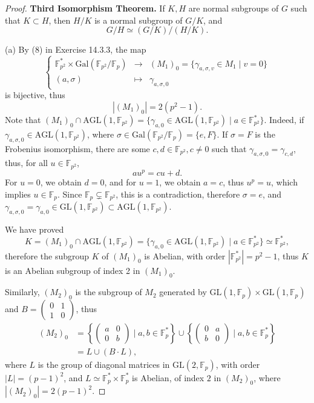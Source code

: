 \documentclass[11pt,a4paper]{article}
\newcommand{\F}{\mathbb{F}}
\newcommand{\Gal}{\mathrm{Gal}}
\begin{document}
{\begin{proof}
{\bf Third Isomorphism Theorem.} If $K,H$ are normal subgroups of $G$ such that $K \subset H$, then $H/K$ is a normal subgroup of $G/K$, and
$$G/H \simeq (G/K)/(H/K).$$

\item[(a)] 
 By (8) in Exercise 14.3.3, the map
$$
\left\{
\begin{array}{ccc}
\F_{p^2}^*  \times \Gal(\F_{p^2}/\F_p) & \to & (M_1)_0 = \{\gamma_{a,\sigma,v}\in M_1 \mid v=0 \}\\
(a,\sigma) & \mapsto &\gamma_{a,\sigma,0}
\end{array}
\right.
$$
is bijective, thus
$$|(M_1)_0| = 2(p^2-1).$$
Note that $(M_1)_0 \cap \mathrm{AGL}(1,\F_{p^2}) = \{\gamma_{a,0} \in \mathrm{AGL}(1,\F_{p^2}) \mid a \in \F_{p^2}^*\}$. Indeed, if $\gamma_{a,\sigma,0} \in \mathrm{AGL}(1,\F_{p^2})$, where $\sigma \in \Gal(\F_{p^2}/\F_p) = \{e,F\}$. If $\sigma = F$ is the Frobenius isomorphism, there are some $c,d \in \F_{p^2}, c \ne 0$ such that $\gamma_{a,\sigma,0} = \gamma_{c,d}$, thus, for all $u \in \F_{p^2}$,
$$ a u^p = c u +d.$$
For $u = 0$, we obtain $d = 0$, and for $u = 1$, we obtain $a= c$, thus $u^p = u$, which implies $u \in \F_p$. Since $\F_p \subsetneq \F_{p^2}$, this is a contradiction, therefore $\sigma = e$, and $\gamma_{a,\sigma,0} = \gamma_{a,0} \in \mathrm{GL}(1,\F_{p^2}) \subset \mathrm{AGL}(1,\F_{p^2})$.

We have proved
$$K = (M_1)_0 \cap \mathrm{AGL}(1,\F_{p^2}) = \{\gamma_{a,0} \in \mathrm{AGL}(1,\F_{p^2}) \mid a \in \F_{p^2}^*\} \simeq \F_{p^2}^*,$$
therefore the subgroup $K$ of $(M_1)_0$ is Abelian, with order $|\F_{p^2}^*|= p^2-1$, thus $K$ is an Abelian subgroup of index 2 in $(M_1)_0$.

\bigskip

Similarly, $(M_2)_0$ is the subgroup of $M_2$ generated by $\mathrm{GL}(1,\F_p) \times \mathrm{GL}(1,\F_p)$ and $B = \begin{pmatrix} 0 & 1 \\ 1 & 0 \end{pmatrix}$, thus
\begin{align*}
(M_2)_0 &= \left \{  \begin{pmatrix} a & 0 \\ 0 & b \end{pmatrix} \mid a,b \in \F_p^* \right\} \cup \left \{  \begin{pmatrix} 0 & a \\ b & 0 \end{pmatrix} \mid a,b \in \F_p^* \right\} \\
&= L \cup (B\cdot L),
\end{align*}
where $L$ is the group of diagonal matrices in $\mathrm{GL}(2,\F_p)$, with order $|L| = (p-1)^2$, and $L \simeq \F_p^* \times \F_p^*$ is Abelian, of index $2$ in $(M_2)_0$, where $|(M_2)_0| = 2(p-1)^2$.
\bigskip


\end{proof}}
\end{document}

